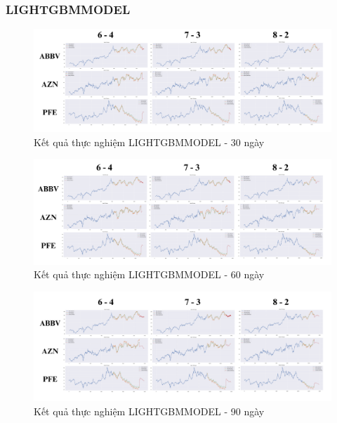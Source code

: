\documentclass[conference]{IEEEtran}
\begin{document}
\subsubsection{LIGHTGBMMODEL}
\begin{figure}[H]
    \centering
    \begin{minipage}{0.5\textwidth}
    \centering
    \includegraphics[width=1\textwidth]{Image/LIGHT30.png}
    \caption{Kết quả thực nghiệm LIGHTGBMMODEL - 30 ngày}
    \label{fig:1}
    \end{minipage}
\end{figure}
\begin{figure}[H]
    \centering
    \begin{minipage}{0.5\textwidth}
    \centering
    \includegraphics[width=1\textwidth]{Image/LIGHT60.png}
    \caption{Kết quả thực nghiệm LIGHTGBMMODEL - 60 ngày}
    \label{fig:1}
    \end{minipage}
\end{figure}
\begin{figure}[H]
    \centering
    \begin{minipage}{0.5\textwidth}
    \centering
    \includegraphics[width=1\textwidth]{Image/LIGHT90.png}
    \caption{Kết quả thực nghiệm LIGHTGBMMODEL - 90 ngày}
    \label{fig:1}
    \end{minipage}
\end{figure}
\end{document}
